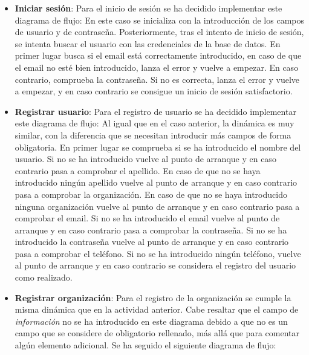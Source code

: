 \begin{itemize}
    \item \textbf{Iniciar sesión}: Para el inicio de sesión se ha decidido implementar este diagrama de flujo:
    En este caso se inicializa con la introducción de los campos de usuario y de
    contraseña. Posteriormente, tras el intento de inicio de sesión, se intenta
    buscar el usuario con las credenciales de la base de datos. En primer lugar
    busca si el email está correctamente introducido, en caso de que el email no
    esté bien introducido, lanza el error y vuelve a empezar. En caso contrario,
    comprueba la contraseña. Si no es correcta, lanza el error y vuelve a
    empezar, y en caso contrario se consigue un inicio de sesión satisfactorio.
    \item \textbf{Registrar usuario}: Para el registro de usuario se ha decidido implementar este diagrama de flujo:
    Al igual que en el caso anterior, la dinámica es muy similar, con la
    diferencia que se necesitan introducir más campos de forma obligatoria.  En primer
    lugar se comprueba si se ha introducido el nombre del usuario. Si no se ha
    introducido vuelve al punto de arranque y en caso contrario pasa a comprobar
    el apellido. En caso de que no se haya introducido ningún apellido vuelve al
    punto de arranque y en caso contrario pasa a comprobar la organización. En
    caso de que no se haya introducido ninguna organización vuelve al punto de
    arranque y en caso contrario pasa a comprobar el email. Si no se ha
    introducido el email vuelve al punto de arranque y en caso contrario pasa a
    comprobar la contraseña. Si no se ha introducido la contraseña vuelve al
    punto de arranque y en caso contrario pasa a comprobar el teléfono. Si no se
    ha introducido ningún teléfono, vuelve al punto de arranque y en caso
    contrario se considera el registro del usuario como realizado.
    \item \textbf{Registrar organización}: Para el registro de la organización se cumple la misma dinámica que en la actividad anterior. Cabe
    resaltar que el campo de \textit{información} no se ha introducido en este
    diagrama debido a que no es un campo que se considere de obligatorio
    rellenado, más allá que para comentar algún elemento adicional. Se ha seguido el siguiente diagrama de flujo:

\end{itemize}

